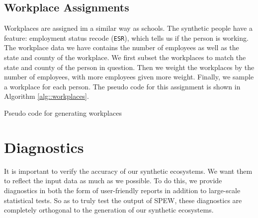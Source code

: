 \documentclass{article}
\begin{document}
	\subsection{Workplace Assignments}

        Workplaces are assigned im a similar way as schools.  The synthetic people have a feature: employment status recode (\texttt{ESR}), which tells us if the person is working.  The workplace data we have contains the number of employees as well as the state and county of the workplace.  We first subset the workplaces to match the state and county of the person in question.  Then we weight the workplaces by the number of employees, with more employees given more weight.  Finally, we sample a workplace for each person.  The pseudo code for this assignment is shown in Algorithm \ref{alg::workplaces}. \\

		\begin{algorithm}[H]
                  \label{alg::workplaces}
			\SetAlgoLined
                \caption{Pseudo code for generating workplaces}
		\end{algorithm}

                \newpage 

                \section{Diagnostics}
                It is important to verify the accuracy of our synthetic ecosystems.  We want them to reflect the input data as much as we possible.  To do this, we provide diagnostics in both the form of user-friendly reports in addition to large-scale statistical tests.  So as to truly test the output of SPEW, these diagnostics are completely orthogonal to the generation of our synthetic ecosystems.
\end{document}

